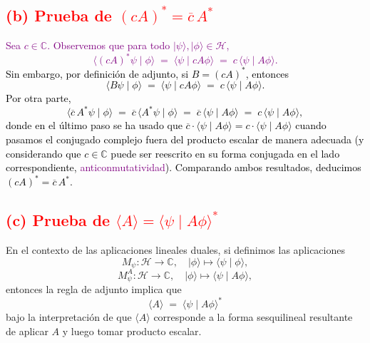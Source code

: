 \documentclass[a4paper,12pt]{article}
\begin{document}
\vspace{1em}

\textcolor{red}{\subsection*{(b) Prueba de $(cA)^* = \overline{c}\, A^*$}}

\noindent
\textcolor{purple}{
Sea $c \in \mathbb{C}$. Observemos que para todo $\lvert \psi\rangle, \lvert \phi\rangle \in \mathcal{H}$,
\[
\langle (cA)^* \psi \mid \phi \rangle 
\;=\; \langle \psi \mid cA \phi \rangle 
\;=\; c \, \langle \psi \mid A \phi \rangle.
\]
}
\textcolor{black}{
Sin embargo, por definición de adjunto, si $B = (cA)^*$, entonces
\[
\langle B \psi \mid \phi \rangle
\;=\; \langle \psi \mid cA \phi \rangle
\;=\; c\, \langle \psi \mid A \phi \rangle.
\]
Por otra parte, 
\[
\langle \overline{c}\, A^* \psi \mid \phi \rangle
\;=\; \overline{c}\,\langle A^* \psi \mid \phi \rangle
\;=\; \overline{c}\,\langle \psi \mid A \phi \rangle
\;=\; c\, \langle \psi \mid A \phi \rangle,
\]
donde en el último paso se ha usado que $\overline{c} \cdot \langle \psi \mid A \phi \rangle
= c \cdot \langle \psi \mid A \phi \rangle$ cuando pasamos el conjugado complejo fuera
del producto escalar de manera adecuada (y considerando que $c \in \mathbb{C}$ puede ser reescrito en su forma conjugada en el lado correspondiente, \textcolor{purple}{anticonmutatividad}).
Comparando ambos resultados, deducimos $(cA)^* = \overline{c}\, A^*$.
}

\vspace{1em}

\textcolor{red}{\subsection*{(c) Prueba de $\langle A \rangle = \langle \psi \mid A \phi\rangle^*$}}

\noindent
En el contexto de las aplicaciones lineales duales, si definimos las aplicaciones
\[
M_\psi : \mathcal{H} \to \mathbb{C}, \quad \lvert \phi \rangle \mapsto \langle \psi \mid \phi\rangle,
\]
\[
M_\psi^A : \mathcal{H} \to \mathbb{C}, \quad \lvert \phi \rangle \mapsto \langle \psi \mid A\phi\rangle,
\]
entonces la regla de adjunto implica que
\[
\langle A \rangle \;=\; \langle \psi \mid A\phi\rangle^*
\]
bajo la interpretación de que $\langle A \rangle$ corresponde a la forma sesquilineal
resultante de aplicar $A$ y luego tomar producto escalar.

\vspace{1em}
\end{document}
